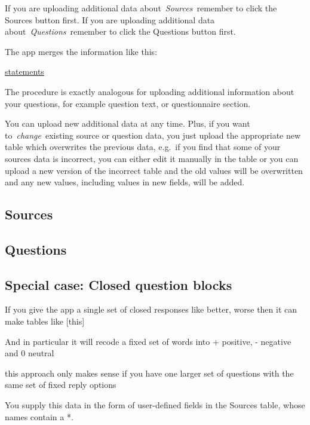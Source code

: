 \documentclass[
]{book}
\begin{document}
If you are uploading additional data about~\emph{Sources}~remember to click the Sources button first. If you are uploading additional data about~\emph{Questions}~remember to click the Questions button first.

The app merges the information like this:

\href{https://www.notion.so/69e73c60edfa423489808c67c3802255}{statements}

The procedure is exactly analogous for uploading additional information about your questions, for example question text, or questionnaire section.

You can upload new additional data at any time. Plus, if you want to~\emph{change}~existing source or question data, you just upload the appropriate new table which overwrites the previous data, e.g.~if you find that some of your sources data is incorrect, you can either edit it manually in the table or you can upload a new version of the incorrect table and the old values will be overwritten and any new values, including values in new fields, will be added.

\hypertarget{sources-1}{%
\subsection{Sources}\label{sources-1}}

\hypertarget{questions-1}{%
\subsection{Questions}\label{questions-1}}

\hypertarget{special-case-closed-question-blocks}{%
\subsection{Special case: Closed question blocks}\label{special-case-closed-question-blocks}}

If you give the app a single set of closed responses like better, worse then it can make tables like {[}this{]}

And in particular it will recode a fixed set of words into + positive, - negative and 0 neutral

this approach only makes sense if you have one larger set of questions with the same set of fixed reply options

You supply this data in the form of user-defined fields in the Sources table, whose names contain a *.
\end{document}
